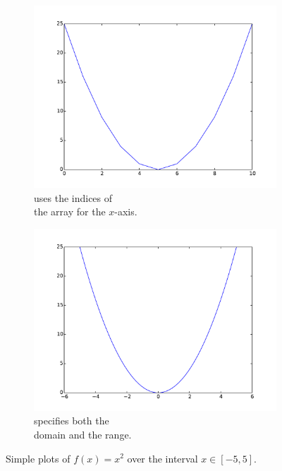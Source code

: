 \begin{figure}[H] %
\captionsetup[subfigure]{justification=centering}
\centering
\begin{subfigure}{.5\textwidth}
    \centering
    \includegraphics[width=\linewidth]{basic1.pdf}
    \caption{ uses the indices of\\the array for the $x$-axis.}
    \label{fig:basic1}
\end{subfigure}%
\begin{subfigure}{.5\textwidth}
    \centering
    \includegraphics[width=\linewidth]{basic2.pdf}
    \caption{ specifies both the\\domain and the range.}
    \label{fig:basic2}
\end{subfigure}
\caption{Simple plots of $f(x) = x^2$ over the interval $x\in[-5,5]$.}
\end{figure}

